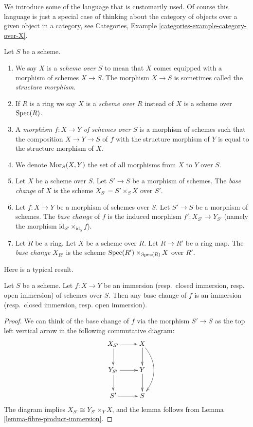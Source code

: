 \medskip\noindent
We introduce some of the language that is customarily used.
Of course this language is just a special case of thinking
about the category of objects over a given object in a category,
see Categories, Example \ref{categories-example-category-over-X}.

\begin{definition}
\label{definition-base-change}
Let $S$ be a scheme.
\begin{enumerate}
\item We say $X$ is a {\it scheme over $S$} to mean that $X$
comes equipped with a morphism of schemes $X \to S$.
The morphism $X \to S$ is sometimes called the
{\it structure morphism}.
\item If $R$ is a ring we say
$X$ is a {\it scheme over $R$} instead of
$X$ is a scheme over $\mathop{\mathrm{Spec}}(R)$.
\item A {\it morphism $f : X \to Y$ of schemes over $S$}
is a morphism of schemes such that the composition
$X \to Y \to S$ of $f$ with the structure morphism of $Y$ is
equal to the structure morphism of $X$.
\item We denote $\mathop{\mathrm{Mor}}\nolimits_S(X, Y)$ the set of all morphisms
from $X$ to $Y$ over $S$.
\item Let $X$ be a scheme over $S$. Let $S' \to S$ be a
morphism of schemes. The {\it base change} of $X$
is the scheme $X_{S'} = S' \times_S X$ over $S'$.
\item Let $f : X \to Y$ be a morphism of schemes over $S$. Let $S' \to S$
be a morphism of schemes. The {\it base change} of $f$ is
the induced morphism $f' : X_{S'} \to Y_{S'}$ (namely the
morphism $\text{id}_{S'} \times_{\text{id}_S} f$).
\item Let $R$ be a ring. Let $X$ be a scheme over $R$.
Let $R \to R'$ be a ring map. The {\it base change} $X_{R'}$
is the scheme $\mathop{\mathrm{Spec}}(R') \times_{\mathop{\mathrm{Spec}}(R)} X$
over $R'$.
\end{enumerate}
\end{definition}

\noindent
Here is a typical result.

\begin{lemma}
\label{lemma-base-change-immersion}
Let $S$ be a scheme. Let $f : X \to Y$ be an
immersion (resp.\ closed immersion, resp. open immersion)
of schemes over $S$. Then any base change of $f$ is an
immersion (resp.\ closed immersion, resp. open immersion).
\end{lemma}

\begin{proof}
We can think of the base change of $f$ via the morphism
$S' \to S$ as the top left vertical arrow in the following
commutative diagram:
$$
\xymatrix{
X_{S'} \ar[r] \ar[d] & X \ar[d] \ar@/^4ex/[dd] \\
Y_{S'} \ar[r] \ar[d] & Y \ar[d] \\
S' \ar[r] & S
}
$$
The diagram implies $X_{S'} \cong Y_{S'} \times_Y X$,
and the lemma follows from Lemma \ref{lemma-fibre-product-immersion}.
\end{proof}

